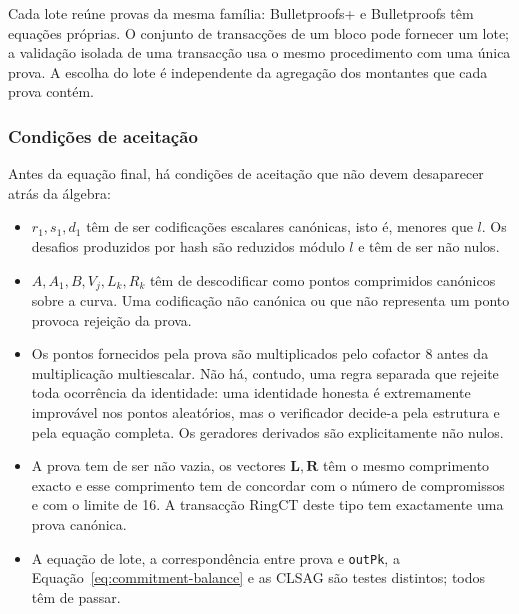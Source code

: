 %
Cada lote reúne provas da mesma família: Bulletproofs+ e Bulletproofs têm
equações próprias. O conjunto de transacções de um bloco pode fornecer um
lote; a validação isolada de uma transacção usa o mesmo procedimento com
uma única prova. A escolha do lote é independente da agregação dos montantes
que cada prova contém.


\subsubsection{Condições de aceitação}
\label{sec:bpp_fim}

Antes da equação final, há condições de aceitação que não devem desaparecer
atrás da álgebra:

\begin{itemize}
 \item \(r_1,s_1,d_1\) têm de ser codificações escalares canónicas, isto é,
 menores que \(l\). Os desafios produzidos por hash são reduzidos módulo \(l\)
 e têm de ser não nulos.

 \item \(A,A_1,B,V_j,L_k,R_k\) têm de descodificar como pontos comprimidos
 canónicos sobre a curva. Uma codificação não canónica ou que não representa
 um ponto provoca rejeição da prova.%

 \item Os pontos fornecidos pela prova são multiplicados pelo cofactor 8 antes
 da multiplicação multiescalar. Não há, contudo, uma regra separada que rejeite
 toda ocorrência da identidade: uma identidade honesta é extremamente
 improvável nos pontos aleatórios, mas o verificador decide-a pela estrutura e
 pela equação completa. Os geradores derivados são explicitamente não nulos.

 \item A prova tem de ser não vazia, os vectores
 \(\boldsymbol L,\boldsymbol R\) têm o mesmo comprimento exacto e esse
 comprimento tem de concordar com o número de compromissos e com o limite de
 16. A transacção RingCT deste tipo tem exactamente uma prova canónica.

 \item A equação de lote, a correspondência entre prova e
 \texttt{outPk}, a Equação~\eqref{eq:commitment-balance} e as CLSAG são testes
 distintos; todos têm de passar.
\end{itemize}


